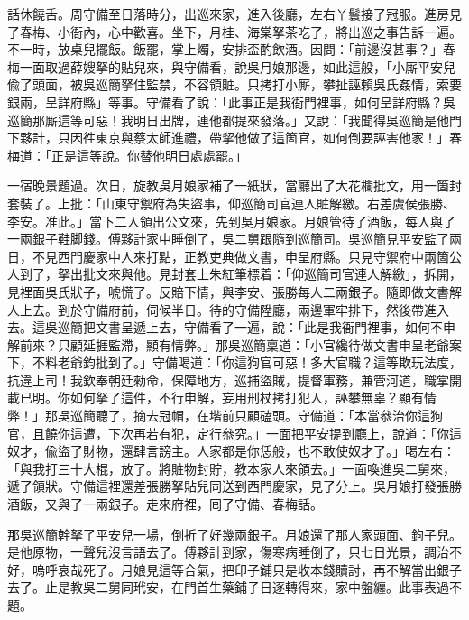 話休饒舌。周守備至日落時分，出巡來家，進入後廳，左右丫鬟接了冠服。進房見了春梅、小衙內，心中歡喜。坐下，月桂、海棠拏茶吃了，將出巡之事告訴一遍。不一時，放桌兒擺飯。飯罷，掌上燭，安排盃酌飲酒。因問：「前邊沒甚事？」春梅一面取過薛嫂拏的貼兒來，與守備看，說吳月娘那邊，如此這般，「小厮平安兒偸了頭面，被吳巡簡拏住監禁，不容領賍。只拷打小厮，攀扯誣賴吳氏姦情，索要銀兩，呈詳府縣」等事。守備看了說：「此事正是我衙門裡事，如何呈詳府縣？吳巡簡那厮這等可惡！我明日出牌，連他都提來發落。」又說：「我聞得吳巡簡是他門下夥計，只因徃東京與蔡太師進禮，帶挈他做了這箇官，如何倒要誣害他家！」春梅道：「正是這等說。你替他明日處處罷。」

一宿晚景題過。次日，旋教吳月娘家補了一紙狀，當廳出了大花欄批文，用一箇封套裝了。上批：「山東守禦府為失盜事，仰巡簡司官連人賍解繳。右差虞侯張勝、李安。准此。」當下二人領出公文來，先到吳月娘家。月娘管待了酒飯，每人與了一兩銀子鞋脚錢。傅夥計家中睡倒了，吳二舅跟隨到巡簡司。吳巡簡見平安監了兩日，不見西門慶家中人來打點，正教吏典做文書，申呈府縣。只見守禦府中兩箇公人到了，拏出批文來與他。見封套上朱紅筆標着：「仰巡簡司官連人解繳」，拆開，見裡面吳氏狀子，唬慌了。反賠下情，{}與李安、張勝每人二兩銀子。隨即做文書解人上去。到於守備府前，伺候半日。待的守備陞廳，兩邊軍牢排下，然後帶進入去。這吳巡簡把文書呈遞上去，守備看了一遍，說：「此是我衙門裡事，如何不申解前來？只顧延捱監滯，顯有情弊。」那吳巡簡稟道：「小官纔待做文書申呈老爺案下，不料老爺鈞批到了。」守備喝道：「你這狗官可惡！多大官職？這等欺玩法度，抗違上司！我欽奉朝廷勑命，保障地方，巡捕盜賊，提督軍務，兼管河道，職掌開載已明。你如何拏了這件，不行申解，妄用刑杖拷打犯人，誣攀無辜？顯有情弊！」那吳巡簡聽了，摘去冠帽，在堦前只顧磕頭。守備道：「本當叅治你這狗官，且饒你這遭，下次再若有犯，定行叅究。」{}一面把平安提到廳上，說道：「你這奴才，偸盜了財物，還肆言謗主。人家都是你恁般，也不敢使奴才了。」喝左右：「與我打三十大棍，放了。將賍物封貯，教本家人來領去。」一面喚進吳二舅來，遞了領狀。守備這裡還差張勝拏貼兒同送到西門慶家，見了分上。吳月娘打發張勝酒飯，又與了一兩銀子。走來府裡，囘了守備、春梅話。

那吳巡簡幹拏了平安兒一場，倒折了好幾兩銀子。月娘還了那人家頭面、鉤子兒。是他原物，一聲兒沒言語去了。傅夥計到家，傷寒病睡倒了，只七日光景，調治不好，嗚呼哀哉死了。{}月娘見這等合氣，把印子鋪只是收本錢贖討，再不解當出銀子去了。止是教吳二舅同玳安，在門首生藥鋪子日逐轉得來，家中盤纏。此事表過不題。


